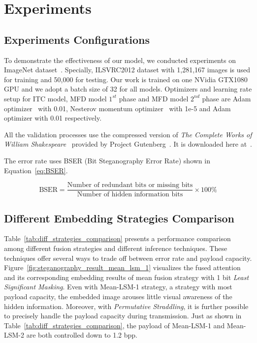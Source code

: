 \section{Experiments}

\subsection{Experiments Configurations}

To demonstrate the effectiveness of our model, we conducted experiments on ImageNet dataset~\cite{ImageNet}. Specially, ILSVRC2012 dataset with 1,281,167 images is used for training and 50,000 for testing. Our work is trained on one NVidia GTX1080 GPU and we adopt a batch size of 32 for all models. Optimizers and learning rate setup for ITC model, MFD model \(1^{st}\) phase and MFD model \(2^{nd}\) phase are Adam optimizer~\cite{Adam} with 0.01, Nesterov momentum optimizer~\cite{Nesterov} with 1e-5 and Adam optimizer with 0.01 respectively.

All the validation processes use the compressed version of \textit{The Complete Works of William Shakespeare}~\cite{Shakespeare} provided by Project Gutenberg~\cite{Gutenberg}. It is downloaded here at~\cite{GutenbergShakespeare}.

The error rate uses BSER (Bit Steganography Error Rate) shown in Equation~\ref{eq:BSER}.

\begin{equation}
  \text{BSER} = \frac{\text{Number of redundant bits or missing bits}}{\text{Number of hidden information bits}} \times 100\%
  \label{eq:BSER}
\end{equation}

\subsection{Different Embedding Strategies Comparison}

Table~\ref{tab:diff_strategies_comparison} presents a performance comparison among different fusion strategies and different inference techniques. These techniques offer several ways to trade off between error rate and payload capacity. Figure~\ref{fig:steganography_result_mean_lsm_1} visualizes the fused attention and its corresponding embedding results of mean fusion strategy with 1 bit \textit{Least Significant Masking}. Even with Mean-LSM-1 strategy, a strategy with most payload capacity, the embedded image arouses little visual awareness of the hidden information. Moreover, with \textit{Permutative Straddling}, it is further possible to precisely handle the payload capacity during transmission. Just as shown in Table~\ref{tab:diff_strategies_comparison}, the payload of Mean-LSM-1 and Mean-LSM-2 are both controlled down to 1.2 bpp.

